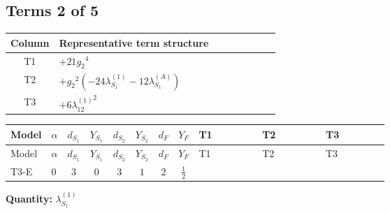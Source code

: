 \documentclass[8pt]{article}
\begin{document}
\begin{landscape}
\subsection*{Terms 2 of 5}
\begin{center}
\begin{tabular}{@{}c >{\raggedright\arraybackslash}p{0.82\linewidth}@{}}
\toprule
Column & Representative term structure \\
\midrule
T1 & \(\displaystyle +21 {g_2}^4\) \\
\midrule
T2 & \(\displaystyle +{g_2}^2 (-24 {\lambda_{S_1}^{(1)}}-12 {\lambda_{S_1}^{(A)}})\) \\
\midrule
T3 & \(\displaystyle +6 {\lambda_{12}^{(1)}}^2\) \\
\midrule
\bottomrule
\end{tabular}
\end{center}
\smallskip
\tiny
\begin{longtable}{@{}llcccccc >{\raggedright\arraybackslash}p{0.21\linewidth} >{\raggedright\arraybackslash}p{0.21\linewidth} >{\raggedright\arraybackslash}p{0.21\linewidth}@{}}
\toprule
Model & $\alpha$ & $d_{S_1}$ & $Y_{S_1}$ & $d_{S_2}$ & $Y_{S_2}$ & $d_F$ & $Y_F$ & T1 & T2 & T3 \\
\midrule
\endfirsthead
\toprule
Model & $\alpha$ & $d_{S_1}$ & $Y_{S_1}$ & $d_{S_2}$ & $Y_{S_2}$ & $d_F$ & $Y_F$ & T1 & T2 & T3 \\
\midrule
\endhead
T3-E & $0$ & $3$ & $0$ & $3$ & $1$ & $2$ & $\frac{1}{2}$ & \scriptsize\adjustbox{max width=\linewidth}{$\begin{gathered} +21 {g_2}^4\end{gathered}$} & \scriptsize\adjustbox{max width=\linewidth}{$\begin{gathered} +{g_2}^2 (-24 {\lambda_{S_1}^{(1)}}-12 {\lambda_{S_1}^{(A)}})\end{gathered}$} & \scriptsize\adjustbox{max width=\linewidth}{$\begin{gathered} +6 {\lambda_{12}^{(1)}}^2\end{gathered}$} \\
\midrule
\bottomrule
\end{longtable}
\clearpage
\noindent\textbf{Quantity: }$\lambda_{S_1}^{(1)}$\par\smallskip

\end{landscape}
\end{document}
